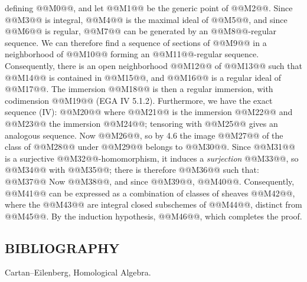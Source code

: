 defining @@M0@@, and let @@M1@@ be the generic point of @@M2@@. Since @@M3@@ is integral, @@M4@@ is the maximal ideal of @@M5@@, and since @@M6@@ is regular, @@M7@@ can be generated by an @@M8@@-regular sequence. We can therefore find a sequence of sections of @@M9@@ in a neighborhood of @@M10@@ forming an @@M11@@-regular sequence. Consequently, there is an open neighborhood @@M12@@ of @@M13@@ such that @@M14@@ is contained in @@M15@@, and @@M16@@ is a regular ideal of @@M17@@. The immersion @@M18@@ is then a regular immersion, with codimension @@M19@@ (EGA IV 5.1.2). Furthermore, we have the exact sequence (IV\qquad):
@@M20@@
where @@M21@@ is the immersion @@M22@@ and @@M23@@ the immersion @@M24@@; tensoring with @@M25@@ gives an analogous sequence. Now @@M26@@, so by 4.6 the image @@M27@@ of the class of @@M28@@ under @@M29@@ belongs to @@M30@@. Since @@M31@@ is a surjective @@M32@@-homomorphism, it induces a \emph{surjection} @@M33@@, so @@M34@@ with @@M35@@; there is therefore @@M36@@ such that:
@@M37@@
Now @@M38@@, and since @@M39@@, @@M40@@. Consequently, @@M41@@ can be expressed as a combination of classes of sheaves @@M42@@, where the @@M43@@ are integral closed subschemes of @@M44@@, distinct from @@M45@@. By the induction hypothesis, @@M46@@, which completes the proof.

\subsection*{BIBLIOGRAPHY}
\begin{enumerate}[label={[\arabic*]}]
\item Cartan--Eilenberg, Homological Algebra.
\end{enumerate}



\providecommand{\etale}{\'etale}
\providecommand{\Ch}{\operatorname{Ch}}


